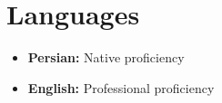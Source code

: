 \section*{Languages}

\begin{itemize}
    \item \textbf{Persian:} Native proficiency
    \item \textbf{English:} Professional proficiency
\end{itemize}
